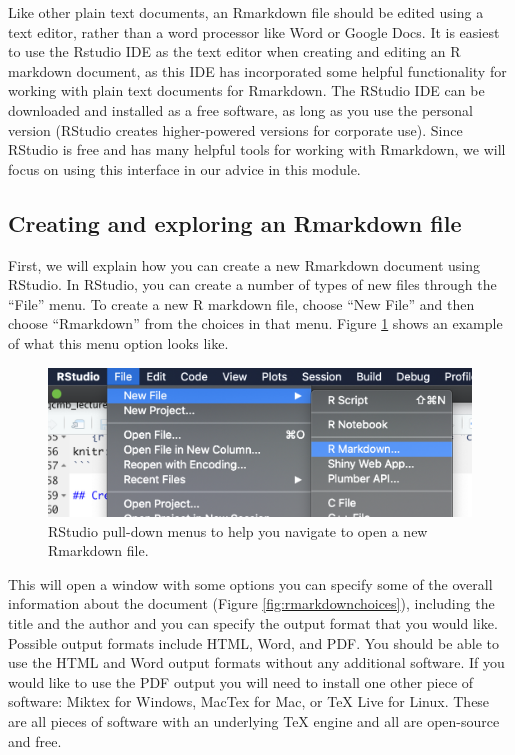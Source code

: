 \documentclass[]{tufte-book}
\begin{document}
Like other plain text documents, an Rmarkdown file should be edited using a text
editor, rather than a word processor like Word or Google Docs. It is easiest to
use the Rstudio IDE as the text editor when creating and editing an R markdown
document, as this IDE has incorporated some helpful functionality for working
with plain text documents for Rmarkdown. The RStudio IDE can be downloaded and
installed as a free software, as long as you use the personal version (RStudio
creates higher-powered versions for corporate use). Since RStudio is free and
has many helpful tools for working with Rmarkdown, we will focus on using this
interface in our advice in this module.

\hypertarget{creating-and-exploring-an-rmarkdown-file}{%
\subsection{Creating and exploring an Rmarkdown file}\label{creating-and-exploring-an-rmarkdown-file}}

First, we will explain how you can create a new Rmarkdown document using
RStudio. In RStudio, you can create a number of types of new files through the
``File'' menu. To create a new R markdown file, choose ``New File'' and then choose
``Rmarkdown'' from the choices in that menu. Figure \ref{fig:rmarkdownnewfile}
shows an example of what this menu option looks like.

\begin{figure}
\includegraphics[width=\textwidth]{figures/rmarkdown_newfile} \caption[RStudio pull-down menus to help you navigate to open a new Rmarkdown file]{RStudio pull-down menus to help you navigate to open a new Rmarkdown file.}\label{fig:rmarkdownnewfile}
\end{figure}

This will open a window with some options you can specify some of the overall
information about the document (Figure \ref{fig:rmarkdownchoices}), including
the title and the author and you can specify the output format that you would
like. Possible output formats include HTML, Word, and PDF. You should be able to
use the HTML and Word output formats without any additional software. If you
would like to use the PDF output you will need to install one other piece of
software: Miktex for Windows, MacTex for Mac, or TeX Live for Linux. These are
all pieces of software with an underlying TeX engine and all are open-source and
free.
\end{document}
